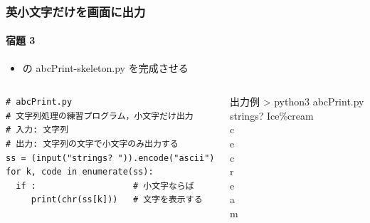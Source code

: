 \begin{frame}
\frametitle{英小文字だけを画面に出力}
\framesubtitle{宿題 3}
  \begin{itemize}
\item \href{https://sites.google.com/presystems.xyz/elementarycs/top}{} の abcPrint-skeleton.py を完成させる
  \end{itemize}
  \begin{columns}
    \begin{column}{0.6\textwidth}
      \begin{lstlisting}[caption={abcPrint.py},label=lst:lowerletterprt]
# abcPrint.py
# 文字列処理の練習プログラム，小文字だけ出力
# 入力: 文字列
# 出力: 文字列の文字で小文字のみ出力する
ss = (input("strings? ")).encode("ascii")
for k, code in enumerate(ss):
  if :                   # 小文字ならば
     print(chr(ss[k]))   # 文字を表示する
      \end{lstlisting}
    \end{column}
    \begin{column}{0.35\textwidth}
      \begin{itembox}{出力例}
\scriptsize
> python3 abcPrint.py\\
strings? Ice\%cream\\
c\\
e\\
c\\
r\\
e\\
a\\
m
      \end{itembox}
    \end{column}
  \end{columns}
\end{frame}
%
%
